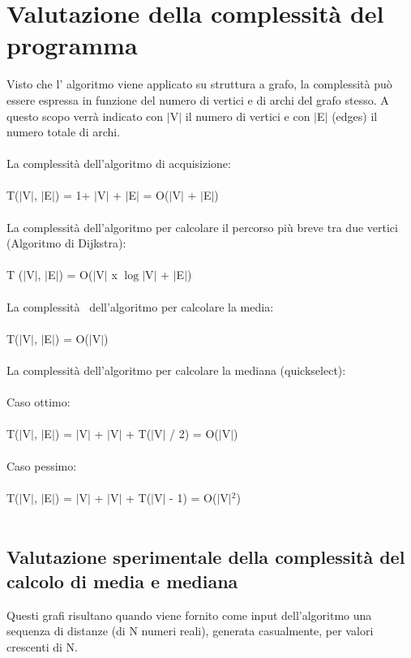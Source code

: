 \documentclass[11pt, a4paper, titlepage, block]{article}
\begin{document}
\section{Valutazione della complessit\`{a} del programma}
	Visto che l' algoritmo viene applicato su struttura a grafo, la complessit\`{a} pu\`{o} essere espressa in 	funzione del numero di vertici e di archi del grafo stesso. A questo scopo verr\`{a} indicato con $|$V$|$ il 
	numero di vertici e con $|$E$|$ (edges) il numero totale di archi.\\
	\\
	La complessit\`{a} dell'algoritmo di acquisizione:\\\\
	\indent T($|$V$|$, $|$E$|$) = 1+ $|$V$|$ + $|$E$|$ = O($|$V$|$ + $|$E$|$)\\\\
	La complessit\`{a} dell'algoritmo per calcolare il percorso pi\`{u} breve tra due vertici (Algoritmo di Dijkstra):\\\\
	\indent T ($|$V$|$, $|$E$|$) = O($|$V$|$ x $\log$$|$V$|$ + $|$E$|$)\\\\
	La complessit\`{a}  dell'algoritmo per calcolare la media:\\\\
	\indent T($|$V$|$, $|$E$|$) = O($|$V$|$)\\\\
	La complessit\`{a} dell'algoritmo per calcolare la mediana (quickselect):\\\\
	\indent Caso ottimo:\\\\
	\indent \indent T($|$V$|$, $|$E$|$) = $|$V$|$ + $|$V$|$ + T($|$V$|$ / 2) = O($|$V$|$)\\\\
	\indent Caso pessimo:\\\\
	\indent \indent T($|$V$|$, $|$E$|$) = $|$V$|$ + $|$V$|$ + T($|$V$|$ - 1) = O($|$V$|$$^{2}$)\\\\
	
		
	\newpage
\subsection{Valutazione sperimentale della complessit\`{a} del calcolo di media e mediana}
	Questi grafi risultano quando viene fornito come input dell'algoritmo una sequenza di distanze (di N numeri reali), generata casualmente, per valori crescenti di N.
\end{document}
